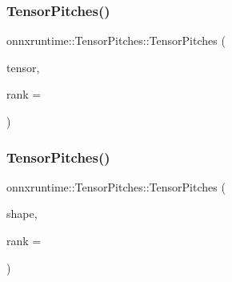 \subsubsection{\texorpdfstring{Tensor\+Pitches()}{TensorPitches()}\hspace{0.1cm}{\footnotesize\ttfamily [1/3]}}
{\footnotesize\ttfamily onnxruntime\+::\+Tensor\+Pitches\+::\+Tensor\+Pitches (\begin{DoxyParamCaption}\item[{const \mbox{\hyperlink{classonnxruntime_1_1Tensor}{Tensor}} \&}]{tensor,  }\item[{\mbox{\hyperlink{mlasi_8h_a503efbc1c6e50825320ad909366b78ab}{size\+\_\+t}}}]{rank = {} }\end{DoxyParamCaption})\hspace{0.3cm}{\ttfamily [inline]}}

\mbox{\label{structonnxruntime_1_1TensorPitches_a3a3a2df2807bd9fb8528d554525ff8f6}} 
\subsubsection{\texorpdfstring{Tensor\+Pitches()}{TensorPitches()}\hspace{0.1cm}{\footnotesize\ttfamily [2/3]}}
{\footnotesize\ttfamily onnxruntime\+::\+Tensor\+Pitches\+::\+Tensor\+Pitches (\begin{DoxyParamCaption}\item[{const \mbox{\hyperlink{classonnxruntime_1_1TensorShape}{Tensor\+Shape}} \&}]{shape,  }\item[{\mbox{\hyperlink{mlasi_8h_a503efbc1c6e50825320ad909366b78ab}{size\+\_\+t}}}]{rank = {} }\end{DoxyParamCaption})\hspace{0.3cm}{\ttfamily [inline]}}

\mbox{\label{structonnxruntime_1_1TensorPitches_a378a2a4970cb24ed3bb0ff64d4e11c36}} 
